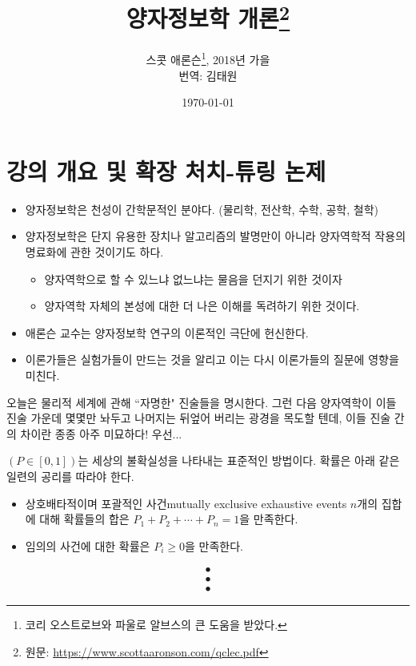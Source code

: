 \documentclass[a4paper,chapter,kosection,atbegshi,hidelinks,itemph]{oblivoir}
\begin{document}
\title{양자정보학 개론\thanks{원문: \url{https://www.scottaaronson.com/qclec.pdf}}}
\author{
    스콧 애론슨\thanks{코리 오스트로브와 파울로 알브스의 큰 도움을 받았다.}, 
    2018년 가을\\
    번역: 김태원
}
\date{\today}
\newpage
\maketitle\thispagestyle{empty}\newpage

\tableofcontents\pagestyle{plain}

\chapter{강의 개요 및 확장 처치-튜링 논제}
\begin{itemize}[label=\(\blacktriangleright\)]
    \item 양자정보학은 천성이 간학문적인 분야다. (물리학, 전산학, 수학, 공학, 철학)
    \item 양자정보학은 단지 유용한 장치나 알고리즘의 발명만이 아니라 양자역학적 작용의 명료화에 관한 것이기도 하다.
    \begin{itemize}
        \item 양자역학으로 할 수 있느냐 없느냐는 물음을 던지기 위한 것이자
        \item 양자역학 자체의 본성에 대한 더 나은 이해를 독려하기 위한 것이다.
    \end{itemize}
    \item 애론슨 교수는 양자정보학 연구의 이론적인 극단에 헌신한다.
    \item 이론가들은 실험가들이 만드는 것을 알리고 이는 다시 이론가들의 질문에 영향을 미친다.
\end{itemize}\hfill\break
오늘은 물리적 세계에 관해 ``자명한" 진술들을 명시한다.
그런 다음 양자역학이 이들 진술 가운데 몇몇만 놔두고 나머지는 뒤엎어 버리는 광경을
목도할 텐데, 이들 진술 간의 차이란 종종 아주 미묘하다!
우선...\hfill\break

\begin{description}[leftmargin=0cm]
    \item[\textbf{확률}\;] 
        $(P\in[0,1])$는 세상의 불확실성을 나타내는 표준적인 방법이다. 
        확률은 아래 같은 일련의 공리를 따라야 한다.
        \begin{itemize}[label=$\blacktriangleright$]
            \item  상호배타적이며 포괄적인 사건{\footnotesize mutually exclusive
            exhaustive events} $n$개의 집합에 대해  
                확률들의 합은 $P_1+P_2+\cdots+P_n=1$을 만족한다.
            \item 임의의 사건에 대한 확률은 $P_i\geq0$을 만족한다.
        \end{itemize}
        \begin{align*}\bullet\\\bullet\\\bullet\end{align*}
\end{description}
\end{document}
